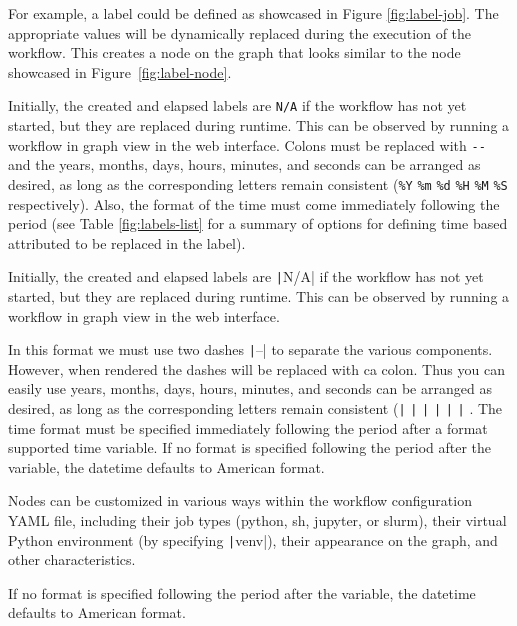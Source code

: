 For example, a label could be defined as showcased in
Figure \ref{fig:label-job}. The appropriate values will be dynamically
replaced during the execution of the workflow.
This creates a node on the graph that looks similar to the node
showcased in Figure~\ref{fig:label-node}.

Initially, the created and elapsed labels are \texttt{N/A} if the
workflow has not yet started, but they are replaced during runtime. This
can be observed by running a workflow in graph view in the web
interface. Colons must be replaced with \texttt{-\/-} and the years, months, days,
hours, minutes, and seconds can be arranged as desired, as long as the
corresponding letters remain consistent (\texttt{\%Y} \texttt{\%m}
\texttt{\%d} \texttt{\%H} \texttt{\%M} \texttt{\%S} respectively). Also,
the format of the time must come immediately following the period (see
Table \ref{fig:labels-list} for a summary of options for defining time
based attributed to be replaced in the label).

Initially, the created and elapsed labels are \texttt|N/A| if the
workflow has not yet started, but they are replaced during runtime. This
can be observed by running a workflow in graph view in the web
interface.

In this format we must use two dashes \texttt|--| to separate the various components. However, when rendered the dashes will be replaced with ca colon. Thus you can easily use years, months, days,
hours, minutes, and seconds can be arranged as desired, as long as the
corresponding letters remain consistent 
(\texttt|%
\texttt|%
\texttt|%
\texttt|%
\texttt|%
\texttt|%
. The time format must be specified immediately following the period after a format supported time variable. If no format is specified following the period after the variable, the
datetime defaults to American format.


Nodes can be customized in various ways within the workflow
configuration YAML file, including their job types (python, sh, jupyter,
or slurm), their virtual Python environment (by specifying
\texttt|venv|), their appearance on the graph, and other
characteristics.

If no format is specified following the period after the variable, the
datetime defaults to American format.


